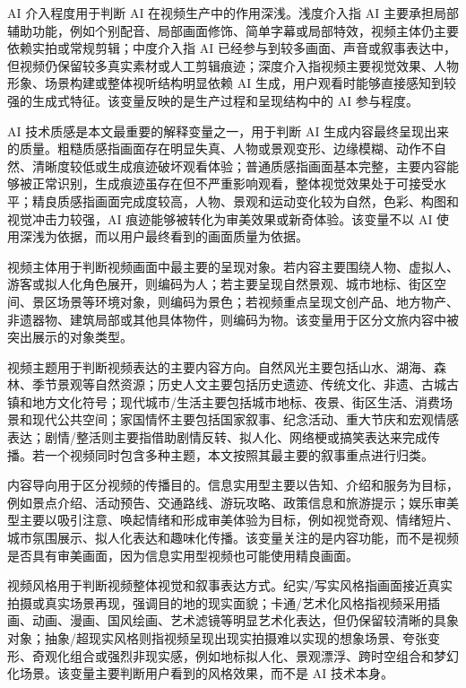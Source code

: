 AI 介入程度用于判断 AI 在视频生产中的作用深浅。浅度介入指 AI 主要承担局部辅助功能，例如个别配音、局部画面修饰、简单字幕或局部特效，视频主体仍主要依赖实拍或常规剪辑；中度介入指 AI 已经参与到较多画面、声音或叙事表达中，但视频仍保留较多真实素材或人工剪辑痕迹；深度介入指视频主要视觉效果、人物形象、场景构建或整体视听结构明显依赖 AI 生成，用户观看时能够直接感知到较强的生成式特征。该变量反映的是生产过程和呈现结构中的 AI 参与程度。

AI 技术质感是本文最重要的解释变量之一，用于判断 AI 生成内容最终呈现出来的质量。粗糙质感指画面存在明显失真、人物或景观变形、边缘模糊、动作不自然、清晰度较低或生成痕迹破坏观看体验；普通质感指画面基本完整，主要内容能够被正常识别，生成痕迹虽存在但不严重影响观看，整体视觉效果处于可接受水平；精良质感指画面完成度较高，人物、景观和运动变化较为自然，色彩、构图和视觉冲击力较强，AI 痕迹能够被转化为审美效果或新奇体验。该变量不以 AI 使用深浅为依据，而以用户最终看到的画面质量为依据。

视频主体用于判断视频画面中最主要的呈现对象。若内容主要围绕人物、虚拟人、游客或拟人化角色展开，则编码为人；若主要呈现自然景观、城市地标、街区空间、景区场景等环境对象，则编码为景色；若视频重点呈现文创产品、地方物产、非遗器物、建筑局部或其他具体物件，则编码为物。该变量用于区分文旅内容中被突出展示的对象类型。

视频主题用于判断视频表达的主要内容方向。自然风光主要包括山水、湖海、森林、季节景观等自然资源；历史人文主要包括历史遗迹、传统文化、非遗、古城古镇和地方文化符号；现代城市/生活主要包括城市地标、夜景、街区生活、消费场景和现代公共空间；家国情怀主要包括国家叙事、纪念活动、重大节庆和宏观情感表达；剧情/整活则主要指借助剧情反转、拟人化、网络梗或搞笑表达来完成传播。若一个视频同时包含多种主题，本文按照其最主要的叙事重点进行归类。

内容导向用于区分视频的传播目的。信息实用型主要以告知、介绍和服务为目标，例如景点介绍、活动预告、交通路线、游玩攻略、政策信息和旅游提示；娱乐审美型主要以吸引注意、唤起情绪和形成审美体验为目标，例如视觉奇观、情绪短片、城市氛围展示、拟人化表达和趣味化传播。该变量关注的是内容功能，而不是视频是否具有审美画面，因为信息实用型视频也可能使用精良画面。

视频风格用于判断视频整体视觉和叙事表达方式。纪实/写实风格指画面接近真实拍摄或真实场景再现，强调目的地的现实面貌；卡通/艺术化风格指视频采用插画、动画、漫画、国风绘画、艺术滤镜等明显艺术化表达，但仍保留较清晰的具象对象；抽象/超现实风格则指视频呈现出现实拍摄难以实现的想象场景、夸张变形、奇观化组合或强烈非现实感，例如地标拟人化、景观漂浮、跨时空组合和梦幻化场景。该变量主要判断用户看到的风格效果，而不是 AI 技术本身。


